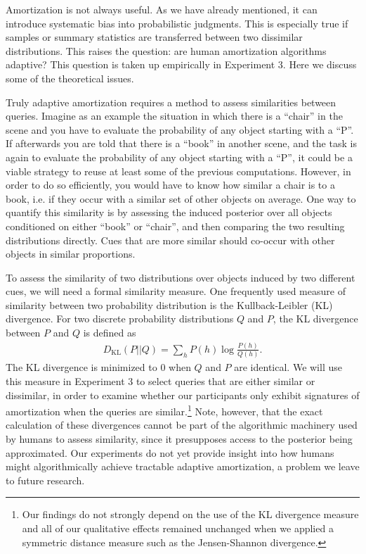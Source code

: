 Amortization is not always useful. As we have already mentioned, it can introduce systematic bias into probabilistic judgments. This is especially true if samples or summary statistics are transferred between two dissimilar distributions. This raises the question: are human amortization algorithms adaptive? This question is taken up empirically in Experiment 3. Here we discuss some of the theoretical issues.

Truly adaptive amortization requires a method to assess similarities between queries. Imagine as an example the situation in which there is a ``chair'' in the scene and you have to evaluate the probability of any object starting with a ``P''. If afterwards you are told that there is a ``book'' in another scene, and the task is again to evaluate the probability of any object starting with a ``P'', it could be a viable strategy to reuse at least some of the previous computations. However, in order to do so efficiently, you would have to know how similar a chair is to a book, i.e. if they occur with a similar set of other objects on average. One way to quantify this similarity is by assessing the induced posterior over all objects conditioned on either ``book'' or ``chair'', and then comparing the two resulting distributions directly. Cues that are more similar should co-occur with other objects in similar proportions.

To assess the similarity of two distributions over objects induced by two different cues, we will need a formal similarity measure. One frequently used measure of similarity between two probability distribution is the Kullback-Leibler (KL) divergence. 
For two discrete probability distributions $Q$ and $P$, the KL divergence between $P$ and $Q$ is defined as
\begin{align}
D_{\text{KL}}(P||Q)=\sum_{h} P(h) \log{\frac{P(h)}{Q(h)}}.
\end{align}
The KL divergence is minimized to 0 when $Q$ and $P$ are identical. We will use this measure in Experiment 3 to select queries that are either similar or dissimilar, in order to examine whether our participants only exhibit signatures of amortization when the queries are similar.\footnote{Our findings do not strongly depend on the use of the KL divergence measure and all of our qualitative effects remained unchanged when we applied a symmetric distance measure such as the Jensen-Shannon divergence.} Note, however, that the exact calculation of these divergences cannot be part of the algorithmic machinery used by humans to assess similarity, since it presupposes access to the posterior being approximated. Our experiments do not yet provide insight into how humans might algorithmically achieve tractable adaptive amortization, a problem we leave to future research.


